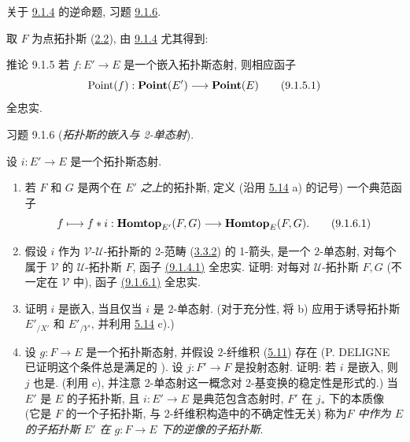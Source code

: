 关于 \hyperref[IV.prop9.1.4]{9.1.4} 的逆命题,
\cf 习题 \hyperref[IV.exer9.1.6]{9.1.6}.

取 $F$ 为点拓扑斯 (\hyperref[IV.subsec2.2]{2.2}),
由 \hyperref[IV.prop9.1.4]{9.1.4} 尤其得到:

\begin{enonce*}{推论 9.1.5}
若 $f:E'\rightarrow E$ 是一个嵌入拓扑斯态射,
则相应函子
\begin{equation*}
\operatorname{Point}(f):\operatorname{\mathbf{Point}}(E')\longrightarrow \operatorname{\mathbf{Point}}(E)\tag{9.1.5.1}
\end{equation*}
全忠实.
\end{enonce*}

\begin{enonce*}[remark]{习题 9.1.6}
(\emph{拓扑斯的嵌入与 2-单态射}).

设 $i:E'\rightarrow E$ 是一个拓扑斯态射.

\begin{enumerate}
\renewcommand{\theenumi}{\alph{enumi}}
\renewcommand{\labelenumi}{\theenumi)}
\item 若 $F$ 和 $G$ 是两个在 $E'$ \emph{之上}的拓扑斯,
定义 (沿用 \hyperref[IV.exer5.14]{5.14} a) 的记号) 一个典范函子
\begin{equation*}
f\longmapsto f\ast i:\operatorname{\mathbf{Homtop}}_{E'}(F,G)\longrightarrow
\operatorname{\mathbf{Homtop}}_E(F,G){}.\tag{9.1.6.1}
\end{equation*}

\item 假设 $i$ 作为 $𝒱\text{-}𝒰$-拓扑斯的 2-范畴
(\hyperref[IV.subsubsec3.3.2]{3.3.2}) 的 1-箭头,
是一个 $2$-单态射,
\ie 对每个属于 $𝒱$ 的 $𝒰$-拓扑斯 $F$,
函子 \hyperref[IV.eq9.1.4.1]{(9.1.4.1)} 全忠实. %
证明: 对每对 $𝒰$-拓扑斯 $F,G$ (不一定在 $𝒱$ 中),
函子 \hyperref[IV.eq9.1.6.1]{(9.1.6.1)} 全忠实. %

\item 证明 $i$ 是嵌入, 当且仅当 $i$ 是 $2$-单态射.
(对于充分性, 将 b) 应用于诱导拓扑斯 $E'_{/X'}$ 和 $E'_{/Y'}$,
并利用 \hyperref[IV.exer5.14]{5.14} c).)

\item 设 $g:F\rightarrow E$ 是一个拓扑斯态射,
并假设 $2$-纤维积 (\hyperref[IV.prop5.11]{5.11})
存在 (P. DELIGNE 已证明这个条件总是满足的
).
设 $j:F'\rightarrow F$ 是投射态射.
证明: 若 $i$ 是嵌入, 则 $j$ 也是.
(利用 c), 并注意 2-单态射这一概念对 2-基变换的稳定性是形式的.)
当 $E'$ 是 $E$ 的子拓扑斯,
且 $i:E'\rightarrow E$ 是典范包含态射时,
$F'$ 在 $j_{\ast}$ 下的本质像
(它是 $F$ 的一个子拓扑斯, 与 2-纤维积构造中\pageoriginale 的不确定性无关)
称为\emph{$F$ 中作为 $E$ 的子拓扑斯 $E'$ 在 $g:F\rightarrow E$ 下的逆像的子拓扑斯}.


\end{enumerate}
\end{enonce*}

